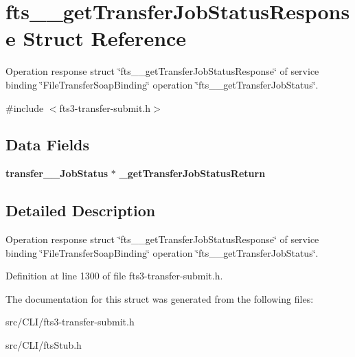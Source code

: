 \section{fts\_\-\_\-getTransferJobStatusResponse Struct Reference}
\label{structfts____getTransferJobStatusResponse}


Operation response struct \char`\"{}fts\_\-\_\-getTransferJobStatusResponse\char`\"{} of service binding \char`\"{}FileTransferSoapBinding\char`\"{} operation \char`\"{}fts\_\-\_\-getTransferJobStatus\char`\"{}.  




{\ttfamily \#include $<$fts3-\/transfer-\/submit.h$>$}

\subsection*{Data Fields}
\begin{DoxyCompactItemize}
\item 
{\bf transfer\_\-\_\-JobStatus} $\ast$ {\bfseries \_\-getTransferJobStatusReturn}\label{structfts____getTransferJobStatusResponse_a5e9828742a7c867527e26522e2b72553}

\end{DoxyCompactItemize}


\subsection{Detailed Description}
Operation response struct \char`\"{}fts\_\-\_\-getTransferJobStatusResponse\char`\"{} of service binding \char`\"{}FileTransferSoapBinding\char`\"{} operation \char`\"{}fts\_\-\_\-getTransferJobStatus\char`\"{}. 

Definition at line 1300 of file fts3-\/transfer-\/submit.h.



The documentation for this struct was generated from the following files:\begin{DoxyCompactItemize}
\item 
src/CLI/fts3-\/transfer-\/submit.h\item 
src/CLI/ftsStub.h\end{DoxyCompactItemize}
